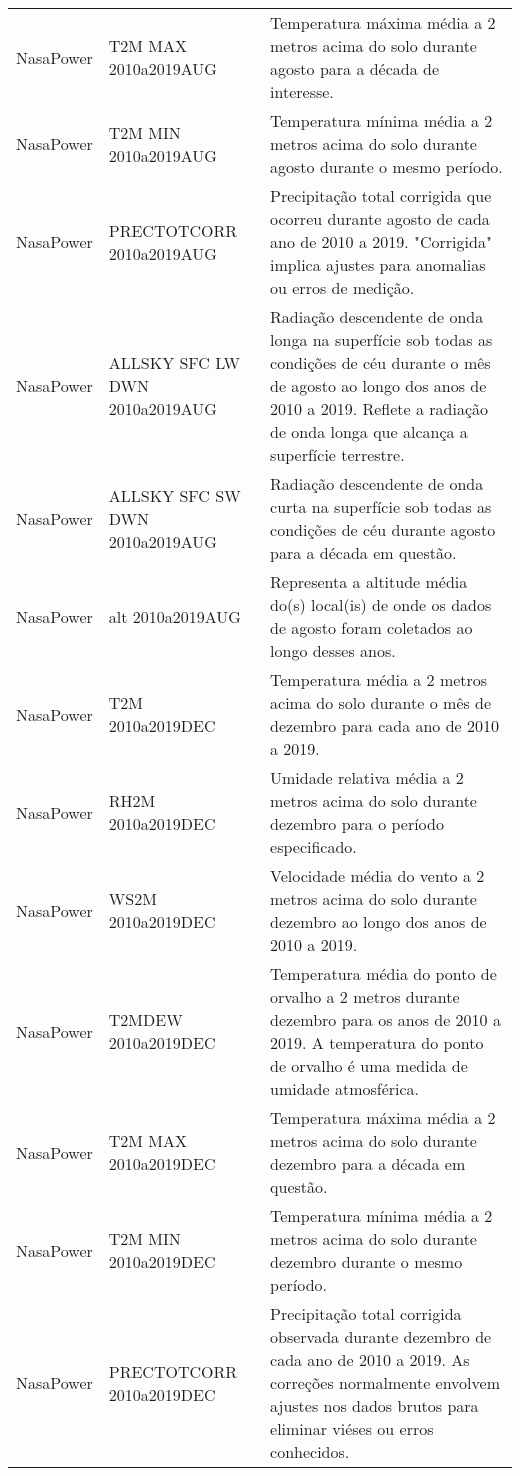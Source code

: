 \begin{longtable}{@{} p{4cm} p{4cm} p{8cm} @{}}
	NasaPower &
	T2M MAX 2010a2019AUG &
	Temperatura máxima média a 2 metros acima do solo durante agosto para a década de interesse. \\
	NasaPower &
	T2M MIN 2010a2019AUG &
	Temperatura mínima média a 2 metros acima do solo durante agosto durante o mesmo período. \\
	NasaPower &
	PRECTOTCORR 2010a2019AUG &
	Precipitação total corrigida que ocorreu durante agosto de cada ano de 2010 a 2019. "Corrigida" implica ajustes para anomalias ou erros de medição. \\
	NasaPower &
	ALLSKY SFC LW DWN 2010a2019AUG &
	Radiação descendente de onda longa na superfície sob todas as condições de céu durante o mês de agosto ao longo dos anos de 2010 a 2019. Reflete a radiação de onda longa que alcança a superfície terrestre. \\
	NasaPower &
	ALLSKY SFC SW DWN 2010a2019AUG &
	Radiação descendente de onda curta na superfície sob todas as condições de céu durante agosto para a década em questão. \\
	NasaPower &
	alt 2010a2019AUG &
	Representa a altitude média do(s) local(is) de onde os dados de agosto foram coletados ao longo desses anos. \\
	NasaPower &
	T2M 2010a2019DEC &
	Temperatura média a 2 metros acima do solo durante o mês de dezembro para cada ano de 2010 a 2019. \\
	NasaPower &
	RH2M 2010a2019DEC &
	Umidade relativa média a 2 metros acima do solo durante dezembro para o período especificado. \\
	NasaPower &
	WS2M 2010a2019DEC &
	Velocidade média do vento a 2 metros acima do solo durante dezembro ao longo dos anos de 2010 a 2019. \\
	NasaPower &
	T2MDEW 2010a2019DEC &
	Temperatura média do ponto de orvalho a 2 metros durante dezembro para os anos de 2010 a 2019. A temperatura do ponto de orvalho é uma medida de umidade atmosférica. \\
	NasaPower &
	T2M MAX 2010a2019DEC &
	Temperatura máxima média a 2 metros acima do solo durante dezembro para a década em questão. \\
	NasaPower &
	T2M MIN 2010a2019DEC &
	Temperatura mínima média a 2 metros acima do solo durante dezembro durante o mesmo período. \\
	NasaPower &
	PRECTOTCORR 2010a2019DEC &
	Precipitação total corrigida observada durante dezembro de cada ano de 2010 a 2019. As correções normalmente envolvem ajustes nos dados brutos para eliminar viéses ou erros conhecidos. \\

\end{longtable}
